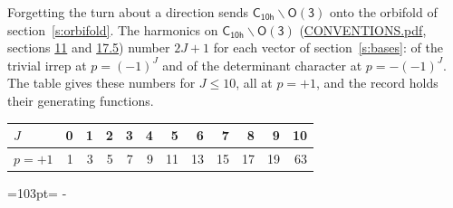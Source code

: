 \documentclass[10pt,a4paper]{article}
\newcommand{\needspace}[1]{\par\penalty-100\begingroup\dimen0=#1\relax\dimen2=\pagegoal
  \advance\dimen2-\pagetotal\ifdim\dimen0>\dimen2\relax\ifdim\dimen2>0pt\vfil\break\fi\fi
  \endgroup}
\numberwithin{equation}{section}
\newcommand{\grp}[1]{\mathsf{#1}}
\begin{document}
Forgetting the turn about a direction sends $\grp{C_{10h}}\backslash\grp{O(3)}$ onto the orbifold of section~\ref{s:orbifold}.
The harmonics on $\grp{C_{10h}}\backslash\grp{O(3)}$ (\href{../../CONVENTIONS.pdf}{CONVENTIONS.pdf}, sections \href{../../CONVENTIONS.pdf\#conv.11}{11} and \href{../../CONVENTIONS.pdf\#conv.17.5}{17.5}) number $2J + 1$ for each vector of section~\ref{s:bases}: of the trivial irrep at $p = (-1)^J$ and of the determinant character at $p = -(-1)^J$. The table gives these numbers for $J \le 10$, all at $p = +1$, and the record holds their generating functions.
{\small\setlength{\tabcolsep}{4pt}\begin{longtable}{@{}lrrrrrrrrrrr@{}}\toprule
$J$ & 0 & 1 & 2 & 3 & 4 & 5 & 6 & 7 & 8 & 9 & 10\\\midrule\endhead
\bottomrule\endfoot\endlastfoot
$p = +1$ & 1 & 3 & 5 & 7 & 9 & 11 & 13 & 15 & 17 & 19 & 63\\
\bottomrule\end{longtable}}
\needspace{103pt}
\end{document}
